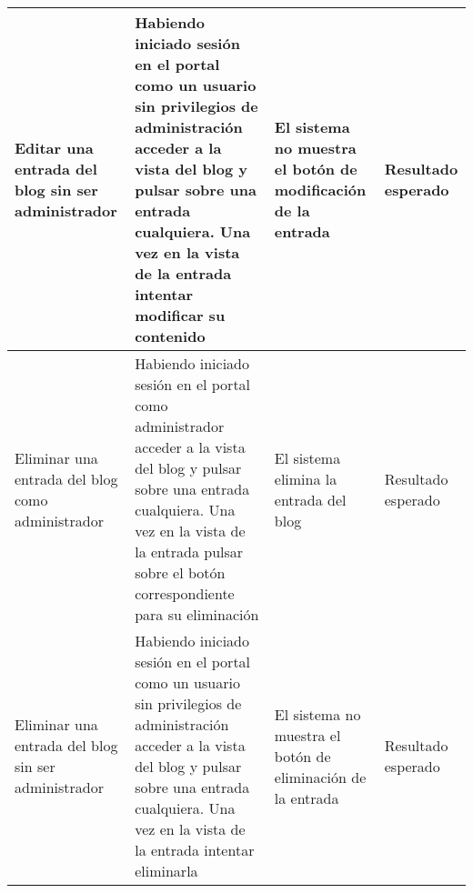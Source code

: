 \begin{landscape}
\begin{longtable}[c]{|p{50mm}|p{50mm}|p{50mm}|p{50mm}|}
	\hline
	Editar una entrada del blog sin ser administrador & Habiendo iniciado sesión en el portal como un usuario sin privilegios de administración acceder a la vista del blog y pulsar sobre una entrada cualquiera.  Una vez en la vista de la entrada intentar modificar su contenido & El sistema no muestra el botón de modificación de la entrada & Resultado esperado\\
	\hline
	Eliminar una entrada del blog como administrador & Habiendo iniciado sesión en el portal como administrador acceder a la vista del blog y pulsar sobre una entrada cualquiera.  Una vez en la vista de la entrada pulsar sobre el botón correspondiente para su eliminación & El sistema elimina la entrada del blog & Resultado esperado\\
	\hline
	Eliminar una entrada del blog sin ser administrador & Habiendo iniciado sesión en el portal como un usuario sin privilegios de administración acceder a la vista del blog y pulsar sobre una entrada cualquiera.  Una vez en la vista de la entrada intentar eliminarla & El sistema no muestra el botón de eliminación de la entrada & Resultado esperado\\
	\hline
	\hline
	
	 \end{longtable}
\end{landscape} 
	 
